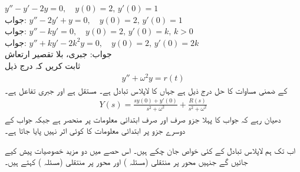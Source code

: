 \quad
$y''-y'-2y=0,\quad y(0)=2, \, y'(0)=1$\\
جواب:
\quad
$y''-2y'+y=0,\quad y(0)=2,\, y'(0)=1$\\
جواب:
\quad
$y''-ky'=0,\quad y(0)=2, \, y'(0)=k, \, k>0$\\
جواب:
\quad
$y''+ky'-2k^2y=0,\quad y(0)=2,\, y'(0)=2k$\\
جواب:
\quad جبری، بلا تقصیر ارتعاش\\
ثابت کریں کہ درج ذیل
\begin{align*}
y''+\omega^2y=r(t)
\end{align*}
کے ضمنی مساوات کا حل درج ذیل ہے جہاں  کا لاپلاس تبادل  ہے۔   مستقل ہے اور  جبری تفاعل ہے۔
\begin{align*}
Y(s)=\frac{sy(0)+y'(0)}{s^2+\omega^2}+\frac{R(s)}{s^2+\omega^2}
\end{align*}
دھیان رہے کہ جواب کا پہلا جزو صرف اور صرف ابتدائی معلومات پر منحصر ہے جبکہ جواب کے دوسرے جزو پر ابتدائی معلومات کا کوئی اثر نہیں پایا جاتا ہے۔ 

اب تک ہم لاپلاس تبادل کے کئی خواص جان چکے ہیں۔ اس حصے میں دو مزید خصوصیات پیش کیے جائیں گے جنہیں  محور پر منتقلی (مسئلہ ) اور  محور پر منتقلی (مسئلہ ) کہتے ہیں۔

